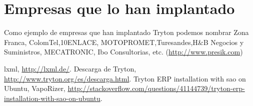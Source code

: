 \documentclass{article}
\begin{document}
\section{Empresas que lo han implantado}
Como ejemplo de empresas que han implantado Tryton podemos nombrar Zona Franca, ColomTel,10ENLACE, MOTOPROMET,Turesandes,H\&B Negocios y Suministros, MECATRONIC, Ibo Consultorias, etc.
(\url{http://www.presik.com})

\begin{thebibliography}{99}
 lxml, \url{http://lxml.de/}.
 Descarga de Tryton, \url{http://www.tryton.org/es/descarga.html}.
 Tryton ERP installation with sao on Ubuntu, VapoRizer, \url{http://stackoverflow.com/questions/41144739/tryton-erp-installation-with-sao-on-ubuntu}.
\end{thebibliography}
\end{document}

